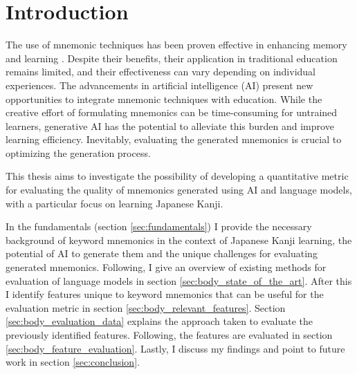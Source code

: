 \section{Introduction} \label{sec:body_motivation}

The use of mnemonic techniques has been proven effective in enhancing memory and learning \cite{campos_2011, putnam_2015}. Despite their benefits, their application in traditional education remains limited, and their effectiveness can vary depending on individual experiences. The advancements in artificial intelligence (AI) present new opportunities to integrate mnemonic techniques with education. While the creative effort of formulating mnemonics can be time-consuming for untrained learners, generative AI has the potential to alleviate this burden and improve learning efficiency. Inevitably, evaluating the generated mnemonics is crucial to optimizing the generation process.

This thesis aims to investigate the possibility of developing a quantitative metric for evaluating the quality of mnemonics generated using AI and language models, with a particular focus on learning Japanese Kanji.

In the fundamentals (section \ref{sec:fundamentals}) I provide the necessary background of keyword mnemonics in the context of Japanese Kanji learning, the potential of AI to generate them and the unique challenges for evaluating generated mnemonics. Following, I give an overview of existing methods for evaluation of language models in section \ref{sec:body_state_of_the_art}. After this I identify features unique to keyword mnemonics that can be useful for the evaluation metric in section \ref{sec:body_relevant_features}. Section \ref{sec:body_evaluation_data} explains the approach taken to evaluate the previously identified features. Following, the features are evaluated in section \ref{sec:body_feature_evaluation}. Lastly, I discuss my findings and point to future work in section \ref{sec:conclusion}.
